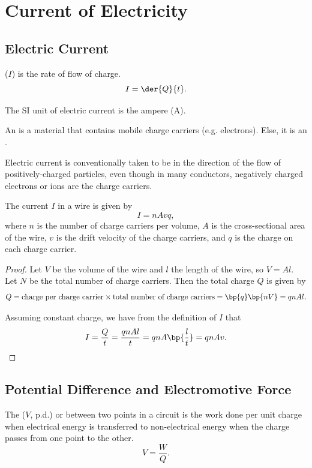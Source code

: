 \chapter{Current of Electricity}

\section{Electric Current}

\begin{definition}
     ($I$) is the rate of flow of charge. \[I = \der{Q}{t}.\]
\end{definition}

The SI unit of electric current is the ampere (A).

\begin{definition}
    An  is a material that contains mobile charge carriers (e.g. electrons). Else, it is an .
\end{definition}

Electric current is conventionally taken to be in the direction of the flow of positively-charged particles, even though in many conductors, negatively charged electrons or ions are the charge carriers.

\begin{proposition}
    The current $I$ in a wire is given by \[I = nAvq,\] where $n$ is the number of charge carriers per volume, $A$ is the cross-sectional area of the wire, $v$ is the drift velocity of the charge carriers, and $q$ is the charge on each charge carrier.
\end{proposition}
\begin{proof}
    Let $V$ be the volume of the wire and $l$ the length of the wire, so $V = Al$. Let $N$ be the total number of charge carriers. Then the total charge $Q$ is given by \[Q = \text{charge per charge carrier} \times \text{total number of charge carriers} = \bp{q}\bp{nV} = qnAl.\]

    Assuming constant charge, we have from the definition of $I$ that \[I = \frac{Q}{t} = \frac{qnAl}{t} = qnA \bp{\frac{l}{t}} = qnAv.\]
\end{proof}

\section{Potential Difference and Electromotive Force}

\begin{definition}
    The  ($V$, p.d.) or  between two points in a circuit is the work done per unit charge when electrical energy is transferred to non-electrical energy when the charge passes from one point to the other. \[V = \frac{W}{Q}.\]
\end{definition}

